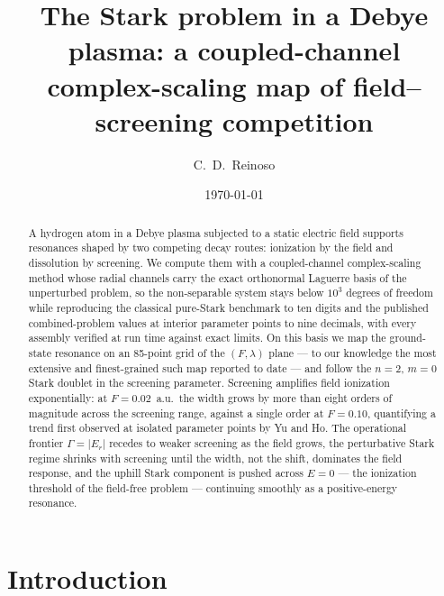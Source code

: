 \documentclass[aps,pra,twocolumn,superscriptaddress,floatfix,longbibliography]{revtex4-2}
\begin{document}
\title{The Stark problem in a Debye plasma: a coupled-channel
complex-scaling map of field--screening competition}

\author{C.~D.~Reinoso}

\date{\today}

\begin{abstract}
A hydrogen atom in a Debye plasma subjected to a static electric field
supports resonances shaped by two competing decay routes: ionization
by the field and dissolution by screening. We compute them with a
coupled-channel complex-scaling method whose radial channels carry the
exact orthonormal Laguerre basis of the unperturbed problem, so the
non-separable system stays below $10^{3}$ degrees of freedom while
reproducing the classical pure-Stark benchmark to ten digits and the
published combined-problem values at interior parameter points to
nine decimals, with every assembly verified at run time against
exact limits. On this
basis we map the ground-state resonance on an 85-point grid of the
$(F,\lambda)$ plane --- to our knowledge the most extensive and
finest-grained such map reported to date --- and follow the $n=2$,
$m=0$ Stark doublet in the screening parameter. Screening amplifies
field ionization exponentially: at $F=0.02$~a.u.\ the width grows by
more than eight orders of magnitude across the screening range,
against a single order at $F=0.10$, quantifying a trend first observed
at isolated parameter points by Yu and Ho. The operational frontier
$\Gamma=|E_r|$ recedes to weaker screening as the field grows, the
perturbative Stark regime shrinks with screening until the width, not
the shift, dominates the field response, and the uphill Stark
component is pushed across $E=0$ --- the ionization threshold of the
field-free problem --- continuing smoothly as a positive-energy
resonance.
\end{abstract}

\maketitle

\section{Introduction}
\end{document}
